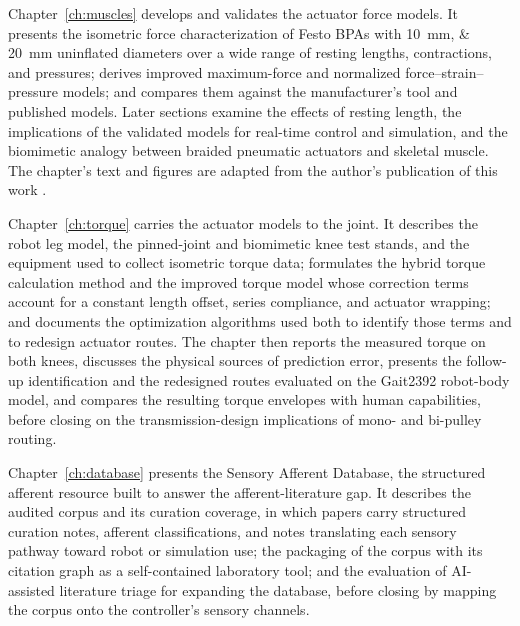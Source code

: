 Chapter~\ref{ch:muscles} develops and validates the actuator force models. It presents the isometric force characterization of Festo BPAs with \qtylist{10;20}{\mm} uninflated diameters over a wide range of resting lengths, contractions, and pressures; derives improved maximum-force and normalized force--strain--pressure models; and compares them against the manufacturer's tool and published models. Later sections examine the effects of resting length, the implications of the validated models for real-time control and simulation, and the biomimetic analogy between braided pneumatic actuators and skeletal muscle. The chapter's text and figures are adapted from the author's publication of this work \citep{bolen_2026}.

Chapter~\ref{ch:torque} carries the actuator models to the joint. It describes the robot leg model, the pinned-joint and biomimetic knee test stands, and the equipment used to collect isometric torque data; formulates the hybrid torque calculation method and the improved torque model whose correction terms account for a constant length offset, series compliance, and actuator wrapping; and documents the optimization algorithms used both to identify those terms and to redesign actuator routes. The chapter then reports the measured torque on both knees, discusses the physical sources of prediction error, presents the follow-up identification and the redesigned routes evaluated on the Gait2392 robot-body model, and compares the resulting torque envelopes with human capabilities, before closing on the transmission-design implications of mono- and bi-pulley routing.

Chapter~\ref{ch:database} presents the Sensory Afferent Database, the structured afferent resource built to answer the afferent-literature gap. It describes the audited corpus and its curation coverage, in which papers carry structured curation notes, afferent classifications, and notes translating each sensory pathway toward robot or simulation use; the packaging of the corpus with its citation graph as a self-contained laboratory tool; and the evaluation of AI-assisted literature triage for expanding the database, before closing by mapping the corpus onto the controller's sensory channels.

